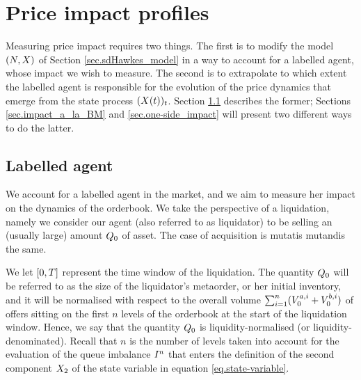 \documentclass[10pt, article,table]{article}
\begin{document}
\section{Price impact profiles}\label{sec.price_impact_profiles}

Measuring price impact requires two things. The first is to modify the  model $(\multiCountingProc,\stateVariable)$ of Section \ref{sec.sdHawkes_model} in a way to account for a labelled agent, whose impact we wish to measure. The second is to extrapolate to which extent the labelled agent is responsible for the evolution of the price dynamics that emerge from the state process $(\stateVariable(t))_{t}$.  Section \ref{sec.labelled_agent} describes the former; Sections \ref{sec.impact_a_la_BM} and \ref{sec.one-side_impact} will present two different ways to do the latter.

\subsection{Labelled agent}\label{sec.labelled_agent}
We account for a labelled agent in the market, and we aim to measure her impact on the dynamics of the orderbook. We take the perspective of a liquidation, namely we consider our agent (also referred to as liquidator) to be selling an (usually large) amount $\metaorderSize$ of asset. The case of acquisition is mutatis mutandis the same. 

We let $\timeWindow$ represent the time window of the liquidation. The quantity $\metaorderSize$ will be referred to as the size of the liquidator's metaorder, or her initial inventory, and it will be normalised with respect to the overall volume $\sum_{i=1}^{n}(\nthBestAskVolume[i]_{0} + \nthBestBidVolume[i]_{0})$ of offers sitting on the first $n$ levels of the orderbook  at the start of the liquidation window. Hence, we say that the quantity $\metaorderSize$ is liquidity-normalised (or liquidity-denominated). Recall that $n$ is the number of levels taken into account for the evaluation of the queue imbalance $\volumeImbalance^n$ that enters the definition of the second component $\stateVariable_2$ of the state variable in equation \eqref{eq.state-variable}.     
\end{document}
